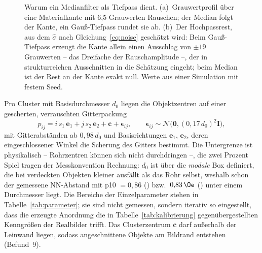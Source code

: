 \begin{figure}[htbp]
\begin{tikzpicture}
\end{tikzpicture}
\caption[Rauschschätzung mit Medianfilter]{Warum ein Medianfilter als Tiefpass
dient. (a)~Grauwertprofil über eine Materialkante mit 6,5 Grauwerten Rauschen;
der Median folgt der Kante, ein Gauß-Tiefpass rundet sie ab. (b)~Der
Hochpassrest, aus dem $\hat\sigma$ nach Gleichung~\eqref{eq:noise} geschätzt
wird: Beim Gauß-Tiefpass erzeugt die Kante allein einen Ausschlag von $\pm19$
Grauwerten -- das Dreifache der Rauschamplitude --, der in strukturreichen
Ausschnitten in die Schätzung eingeht; beim Median ist der Rest an der Kante
exakt null. Werte aus einer Simulation mit festem Seed.}
\label{abb:rauschschaetzung}
\end{figure}

\fi

 Pro Cluster mit Basisdurchmesser $d_0$ liegen die
Objektzentren auf einer gescherten, verrauschten Gitterpackung
\begin{equation}
p_{ij} = i\,s_1\,\mathbf{e}_1 + j\,s_2\,\mathbf{e}_2 + \mathbf{c}
+ \boldsymbol{\epsilon}_{ij},
\qquad \boldsymbol{\epsilon}_{ij} \sim \mathcal{N}\!\big(\mathbf{0},
(0{,}17\,d_0)^2 \mathbf{I}\big),
\label{eq:layout}
\end{equation}
mit Gitterabständen ab $0{,}98\,d_0$ und Basisrichtungen $\mathbf{e}_1$,
$\mathbf{e}_2$, deren eingeschlossener Winkel die Scherung des Gitters bestimmt.
Die Untergrenze ist physikalisch -- Rohrzentren können sich nicht durchdringen
--, die zwei Prozent Spiel tragen der Messkonvention Rechnung: $d_0$ ist über
die \emph{modale} Box definiert, die bei verdeckten Objekten kleiner ausfällt als
das Rohr selbst, weshalb schon der gemessene NN-Abstand mit p10 $=0{,}86$
() bzw.\ $0{,}83\,\Oe$ () unter einem Durchmesser liegt.
Die Bereiche der Einzelparameter stehen in Tabelle~\ref{tab:parameter}; sie sind
nicht gemessen, sondern iterativ so eingestellt, dass die erzeugte Anordnung die
in Tabelle~\ref{tab:kalibrierung} gegenübergestellten Kenngrößen der Realbilder
trifft. Das Clusterzentrum $\mathbf{c}$ darf außerhalb der
Leinwand liegen, sodass angeschnittene Objekte am Bildrand entstehen (Befund~9).

